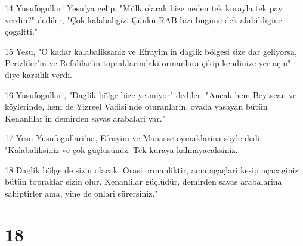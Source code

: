 \par 14 Yusufogullari Yesu'ya gelip, "Mülk olarak bize neden tek kurayla tek pay verdin?" dediler, "Çok kalabaligiz. Çünkü RAB bizi bugüne dek alabildigine çogaltti."
\par 15 Yesu, "O kadar kalabaliksaniz ve Efrayim'in daglik bölgesi size dar geliyorsa, Perizliler'in ve Refalilar'in topraklarindaki ormanlara çikip kendinize yer açin" diye karsilik verdi.
\par 16 Yusufogullari, "Daglik bölge bize yetmiyor" dediler, "Ancak hem Beytsean ve köylerinde, hem de Yizreel Vadisi'nde oturanlarin, ovada yasayan bütün Kenanlilar'in demirden savas arabalari var."
\par 17 Yesu Yusufogullari'na, Efrayim ve Manasse oymaklarina söyle dedi: "Kalabaliksiniz ve çok güçlüsünüz. Tek kuraya kalmayacaksiniz.
\par 18 Daglik bölge de sizin olacak. Orasi ormanliktir, ama agaçlari kesip açacaginiz bütün topraklar sizin olur. Kenanlilar güçlüdür, demirden savas arabalarina sahiptirler ama, yine de onlari sürersiniz."

\chapter{18}

